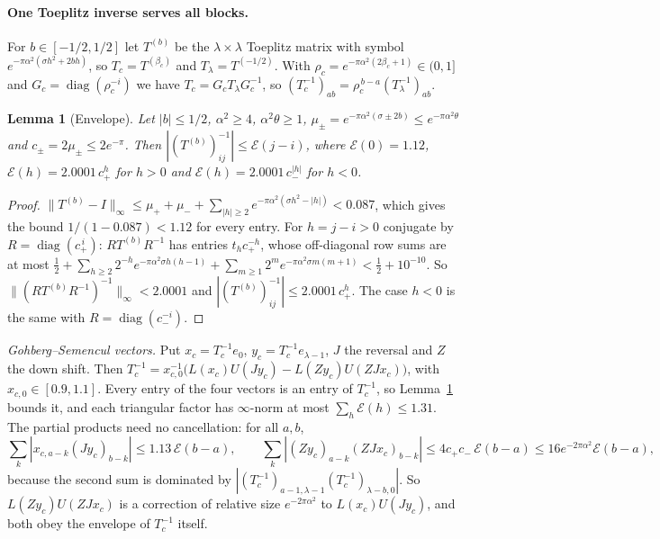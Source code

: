 \documentclass[11pt]{article}
\newtheorem{lemma}{Lemma}
\theoremstyle{remark}\newtheorem*{remark}{Remark}
\begin{document}
\paragraph{One Toeplitz inverse serves all blocks.} For $b\in[-1/2,1/2]$ let $T^{(b)}$ be the
$\lambda\times\lambda$ Toeplitz matrix with symbol $e^{-\pi\alpha^2(\sigma h^2+2bh)}$, so
$T_c=T^{(\beta_c)}$ and $T_\lambda=T^{(-1/2)}$. With $\rho_c=e^{-\pi\alpha^2(2\beta_c+1)}\in(0,1]$
and $G_c=\operatorname{diag}(\rho_c^{-i})$ we have $T_c=G_cT_\lambda G_c^{-1}$, so
$(T_c^{-1})_{ab}=\rho_c^{\,b-a}(T_\lambda^{-1})_{ab}$.

\begin{lemma}[Envelope]\label{lem:envelope}
Let $|b|\le1/2$, $\alpha^2\ge4$, $\alpha^2\theta\ge1$, $\mu_\pm=e^{-\pi\alpha^2(\sigma\pm2b)}\le e^{-\pi\alpha^2\theta}$
and $c_\pm=2\mu_\pm\le2e^{-\pi}$. Then
$|(T^{(b)})^{-1}_{ij}|\le\mathcal E(j-i)$, where $\mathcal E(0)=1.12$,
$\mathcal E(h)=2.0001\,c_+^{h}$ for $h>0$ and $\mathcal E(h)=2.0001\,c_-^{|h|}$ for $h<0$.
\end{lemma}
\begin{proof}
$\|T^{(b)}-I\|_\infty\le\mu_++\mu_-+\sum_{|h|\ge2}e^{-\pi\alpha^2(\sigma h^2-|h|)}<0.087$, which gives
the bound $1/(1-0.087)<1.12$ for every entry. For $h=j-i>0$ conjugate by $R=\operatorname{diag}(c_+^{\,i})$:
$RT^{(b)}R^{-1}$ has entries $t_hc_+^{-h}$, whose off-diagonal row sums are at most
$\tfrac12+\sum_{h\ge2}2^{-h}e^{-\pi\alpha^2\sigma h(h-1)}+\sum_{m\ge1}2^{m}e^{-\pi\alpha^2\sigma m(m+1)}<\tfrac12+10^{-10}$.
So $\|(RT^{(b)}R^{-1})^{-1}\|_\infty<2.0001$ and $|(T^{(b)})^{-1}_{ij}|\le2.0001\,c_+^{h}$. The case
$h<0$ is the same with $R=\operatorname{diag}(c_-^{-i})$.
\end{proof}

\emph{Gohberg--Semencul vectors.} Put $x_c=T_c^{-1}e_0$, $y_c=T_c^{-1}e_{\lambda-1}$, $J$ the
reversal and $Z$ the down shift. Then
$T_c^{-1}=x_{c,0}^{-1}\bigl(L(x_c)U(Jy_c)-L(Zy_c)U(ZJx_c)\bigr)$, with $x_{c,0}\in[0.9,1.1]$.
Every entry of the four vectors is an entry of $T_c^{-1}$, so Lemma~\ref{lem:envelope} bounds it,
and each triangular factor has $\infty$-norm at most $\sum_h\mathcal E(h)\le1.31$.
The partial products need no cancellation: for all $a,b$,
\[
 \sum_k|x_{c,a-k}(Jy_c)_{b-k}|\le1.13\,\mathcal E(b-a),\qquad
 \sum_k|(Zy_c)_{a-k}(ZJx_c)_{b-k}|\le4c_+c_-\,\mathcal E(b-a)\le16e^{-2\pi\alpha^2}\mathcal E(b-a),
\]
because the second sum is dominated by $|(T_c^{-1})_{a-1,\lambda-1}(T_c^{-1})_{\lambda-b,0}|$. So
$L(Zy_c)U(ZJx_c)$ is a correction of relative size $e^{-2\pi\alpha^2}$ to $L(x_c)U(Jy_c)$, and both obey the envelope of $T_c^{-1}$ itself.
\end{document}
